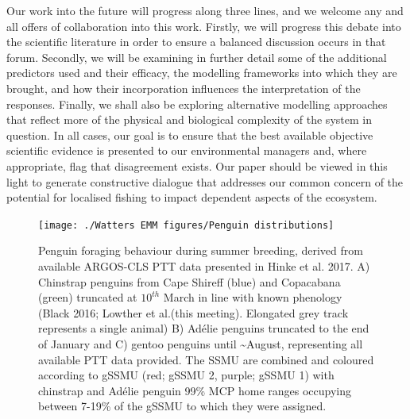 \documentclass[]{elsarticle} %
\begin{document}
Our work into the future will progress along three lines, and we welcome
any and all offers of collaboration into this work. Firstly, we will
progress this debate into the scientific literature in order to ensure a
balanced discussion occurs in that forum. Secondly, we will be examining
in further detail some of the additional predictors used and their
efficacy, the modelling frameworks into which they are brought, and how
their incorporation influences the interpretation of the responses.
Finally, we shall also be exploring alternative modelling approaches
that reflect more of the physical and biological complexity of the
system in question. In all cases, our goal is to ensure that the best
available objective scientific evidence is presented to our
environmental managers and, where appropriate, flag that disagreement
exists. Our paper should be viewed in this light to generate
constructive dialogue that addresses our common concern of the potential
for localised fishing to impact dependent aspects of the ecosystem.
\newpage  

\begin{figure}
\texttt{[image: ./Watters EMM figures/Penguin distributions]} \caption{Penguin foraging behaviour during summer breeding, derived from available ARGOS-CLS PTT data presented in Hinke et al. 2017. A) Chinstrap penguins from Cape Shireff (blue) and Copacabana (green) truncated at $10^{th}$ March in line with known phenology (Black 2016; Lowther et al.(this meeting).  Elongated grey track represents a single animal) B) Adélie penguins truncated to the end of January and C) gentoo penguins until \textasciitilde{}August, representing all available PTT data provided. The SSMU are combined and coloured according to gSSMU (red; gSSMU 2, purple; gSSMU 1) with chinstrap and Adélie penguin 99\% MCP home ranges occupying between 7-19\% of the gSSMU to which they were assigned.}\label{fig:Penguin distribution plots}
\end{figure}
\end{document}
